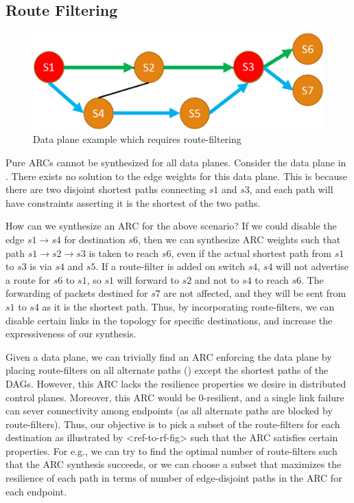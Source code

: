 \subsection{Route Filtering} \label{sec:routefilter}
\begin{figure}[h!] 
	\centering
	\includegraphics[width=\columnwidth]{figures/diamond.eps}
	\caption{Data plane example which requires route-filtering} \label{fig:diamond}
\end{figure}
Pure ARCs cannot be synthesized for all data planes. Consider the data
plane in . 
There exists no solution to the edge weights for this data plane. This is because 
there are two disjoint shortest paths connecting $s1$ and $s3$, and each path will have 
constraints
asserting it is the shortest of the two paths. 

How can we synthesize an ARC for the above scenario? 
If we could disable the edge
$s1 \rightarrow s4$ for destination $s6$, then we can synthesize ARC weights
such that path $s1 \rightarrow s2 \rightarrow s3$ is taken to reach $s6$, 
even if the actual shortest path
from $s1$ to $s3$ is via $s4$ and $s5$. 
If a route-filter is added on switch $s4$, $s4$ 
will not advertise a route for $s6$ to $s1$, so 
$s1$ will forward to $s2$ and not to $s4$
to reach $s6$. The forwarding of packets destined
for $s7$ are not affected, and they will be sent from
$s1$ to $s4$ as it is the shortest path.
Thus, by incorporating route-filters, we can
disable certain links in the topology 
for specific destinations, and increase the 
expressiveness of our synthesis. 

Given a data plane, we can trivially find an 
ARC enforcing the data plane by placing 
route-filters on all alternate paths ()%
except the shortest paths of the DAGs. However, this
ARC lacks the resilience properties we desire in
distributed control planes. Moreover, this ARC would be
0-resilient, and a single link failure can sever 
connectivity among endpoints (as all alternate paths
are blocked by route-filters). Thus, our objective is
to pick a subset of the route-filters for each destination
as illustrated by <ref-to-rf-fig> such that the 
ARC satisfies certain properties. For e.g., we can
try to find the optimal number of route-filters such 
that the ARC synthesis succeeds, or we can choose a
subset that maximizes the resilience of each path 
in terms of number of edge-disjoint paths in the ARC
for each endpoint. 

